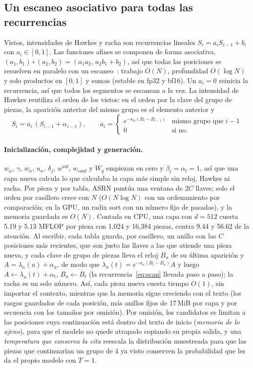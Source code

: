\documentclass[11pt]{article}
\begin{document}
\subsection{Un escaneo asociativo para todas las recurrencias}
\label{sec:scan}
Vistos, intensidades de Hawkes y racha son recurrencias lineales $S_i=a_iS_{i-1}+b_i$ con $a_i\in[0,1]$. Las funciones
afines se componen de forma asociativa, $(a_1,b_1)\circ(a_2,b_2)=(a_1a_2,\,a_2b_1+b_2)$, así que todas las posiciones se
resuelven en paralelo con un escaneo~\cite{blelloch1990prefix,martin2018parallelizing}: trabajo $O(N)$, profundidad
$O(\log N)$ y solo productos en $[0,1]$ y sumas (estable en fp32 y bf16). Un $a_i=0$ reinicia la recurrencia, así que
todos los segmentos se escanean a la vez. La intensidad de Hawkes reutiliza el orden de los vistos: en el orden por la
clave del grupo de piezas, la aparición anterior del mismo grupo es el elemento anterior y
\begin{equation}
S_i=a_i\,(S_{i-1}+\alpha_{i-1}),\qquad
a_i=\begin{cases}e^{-\kappa_n(B_i-B_{i-1})}&\text{mismo grupo que }i-1\\0&\text{si no.}\end{cases}
\label{eq:scan}
\end{equation}

\paragraph{Inicialización, complejidad y generación.} $w_\alpha$, $\gamma$, $w_n$, $u_n$, $\delta_j$,
$w^{\mathrm{suf}}$, $w_{\mathrm{conf}}$ y $W_q$ empiezan en cero y $\beta_t=\alpha_t=1$, así que una capa nueva calcula
lo que calculaba la capa más simple sin reloj, Hawkes ni racha. Por pieza y por tabla, ASRN puntúa una ventana de $2C$
llaves; solo el orden por casillero crece con $N$ ($O(N\log N)$ con un ordenamiento por comparación; en la GPU, un radix
sort con un número fijo de pasadas), y la memoria guardada es $O(N)$. Contada en CPU, una capa con $d=512$ cuesta 5.19 y
5.13 MFLOP por pieza con 1{,}024 y 16{,}384 piezas, contra 9.44 y 56.62 de la atención. Al escribir, cada tabla guarda,
por casillero, un anillo con las $C$ posiciones más recientes, que son justo las llaves a las que atiende una pieza
nueva, y cada clave de grupo de piezas lleva el reloj $B_u$ de su última aparición y $A=\lambda_n(u)+\alpha_u$, de modo
que $\lambda_n(t)=e^{-\kappa_n(B_t-B_u)}A$ y luego $A\leftarrow\lambda_n(t)+\alpha_t$, $B_u\leftarrow B_t$ (la
recurrencia~\eqref{eq:scan} llevada paso a paso); la racha es un solo número. Así, cada pieza nueva cuesta tiempo
$O(1)$, sin importar el contexto, mientras que la memoria sigue creciendo con el texto (los rasgos guardados de cada
posición, más anillos fijos de 17\,MiB por capa y por secuencia con los tamaños por omisión). Por omisión, los
candidatos se limitan a las posiciones cuya continuación está dentro del texto de inicio (\emph{memoria de lo ajeno}),
para que el modelo no quede atrapado copiando su propia salida, y una \emph{temperatura que conserva la cita} reescala
la distribución muestreada para que las piezas que continuarían un grupo de 4 ya visto conserven la probabilidad que les
da el propio modelo con $T=1$.
\end{document}

